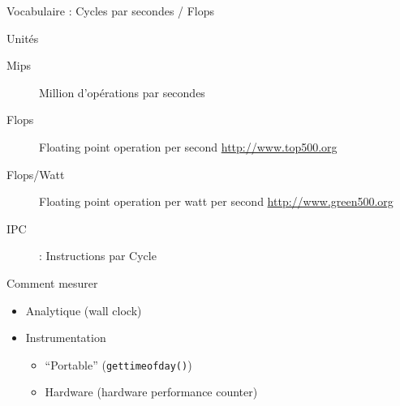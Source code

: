 \begin{Frame}{Vocabulaire : Cycles par secondes / Flops}

  \begin{block}{Unités}
  \begin{description}
  \item[Mips] Million d'opérations par secondes
  \item[Flops] Floating point operation per second \url{http://www.top500.org}
  \item[Flops/Watt] Floating point operation per watt per second  \url{http://www.green500.org}
  \item[IPC] : Instructions par Cycle
  \end{description}
  \end{block}
  \begin{block}{Comment mesurer}
  \begin{itemize}
  \item Analytique (wall clock)
  \item Instrumentation 
    \begin{itemize}
    \item ``Portable'' (\texttt{gettimeofday()})
    \item Hardware (hardware performance counter)
    \end{itemize}
  \end{itemize}
  \end{block}
\end{Frame}



